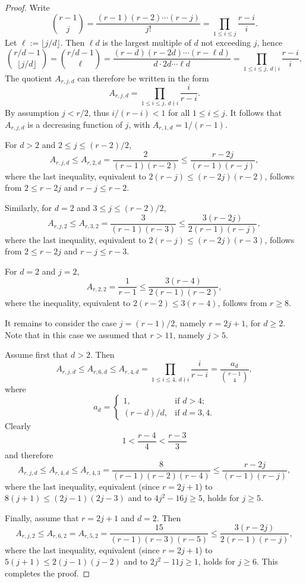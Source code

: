 \documentclass[ALCO,published]{cedram}
\begin{document}
\begin{proof}
    Write
	\[
	   \binom{r-1}{j}
	   = \frac{(r-1)(r-2) \cdots (r-j)}{j!}
	   = \prod_{1 \le i \le j} \frac{r-i}{i}.
	\]
	Let $\ell := \lfloor j/d \rfloor$. Then $\ell d$ is the largest multiple of $d$ not exceeding $j$, hence
	\[
	   \binom{r/d - 1}{\lfloor j/d \rfloor} 
	   = \binom{r/d - 1}{\ell}
	   = \frac{(r-d)(r-2d)\cdots (r-\ell d)}{d \cdot 2d \cdots \ell d}
	   = \prod_{1 \le i \le j,\, d \mid i} \frac{r-i}{i},
	\]
	The quotient $A_{r,j,d}$ can therefore be written in the form
	\begin{equation*}
		A_{r,j,d} 
		= \prod_{1 \le i \le j,\, d \nmid i} \frac{i}{r-i}.
	\end{equation*}
	By assumption $j < r/2$, thus $i/(r-i) < 1$ for all $1 \le i \le j$. It follows that $A_{r,j,d}$ is a decreasing function of $j$, with $A_{r,1,d} = 1/(r-1)$.
    
    For $d > 2$ and $2 \le j \le (r-2)/2$,
    \[
        A_{r,j,d} \le A_{r,2,d} = \frac{2}{(r-1)(r-2)}
        \le \frac{r-2j}{(r-1)(r-j)},
    \]
    where the last inequality, equivalent to $2(r-j) \le (r-2j)(r-2)$, follows from $2 \le r-2j$ and $r-j \le r-2$. 
	
	Similarly, for $d=2$ and $3 \le j \le (r-2)/2$,
	\[
	   A_{r,j,2} \le A_{r,3,2} = \frac{3}{(r-1)(r-3)} 
	   \le \frac{3(r-2j)}{2(r-1)(r-j)},
	\]
	where the last inequality, equivalent to $2(r-j) \le (r-2j)(r-3)$, follows from $2 \le r-2j$ and $r-j \le r-3$.

    For $d = 2$ and $j = 2$,
    \[
        A_{r,2,2} = \frac{1}{r-1} \le \frac{3(r-4)}{2(r-1)(r-2)},
    \]
    where the inequality, equivalent to $2(r-2) \le 3(r-4)$, follows from $r \ge 8$.
        
	It remains to consider the case $j = (r-1)/2$, namely $r = 2j+1$, for $d \ge 2$.
	Note that in this case we assumed that $r > 11$, namely $j > 5$.
	
	Assume first that $d > 2$. Then 
	\[
        A_{r,j,d} \le A_{r,6,d} \le A_{r,4,d}
        = \prod_{1 \le i \le 4,\, d \nmid i} \frac{i}{r-i}
        = \frac{a_d}{\displaystyle\binom{r-1}{4}},
    \]
    where
    \[
        a_d =
        \begin{cases}
            1, &\text{if } d > 4; \\
            (r-d)/d, &\text{if } d = 3,4.
        \end{cases}
    \]
    Clearly	
	\[
	   1 < \frac{r-4}{4} < \frac{r-3}{3} 
	\]
	and therefore 
	\[
	   A_{r,j,d} \le A_{r,4,d} \le A_{r,4,3} 
	   = \frac{8}{(r-1)(r-2)(r-4)}
	   \le \frac{r-2j}{(r-1)(r-j)},
	\]
	where the last inequality, equivalent (since $r = 2j+1$) to $8(j+1) \le (2j-1)(2j-3)$ and to $4j^2 - 16j \ge 5$, holds for $j \ge 5$.
	
	Finally, assume that $r = 2j+1$ and $d = 2$.
	Then 
	\[
	   A_{r,j,2} \le A_{r,6,2} = A_{r,5,2} 
	   = \frac{15}{(r-1)(r-3)(r-5)}
	   \le \frac{3(r-2j)}{2(r-1)(r-j)},
	\]
	where the last inequality, equivalent (since $r = 2j+1$) to $5(j+1) \le 2(j-1)(j-2)$ and to $2j^2 - 11j \ge 1$, holds for $j \ge 6$.
	This completes the proof.
\end{proof}
	
\end{document}
